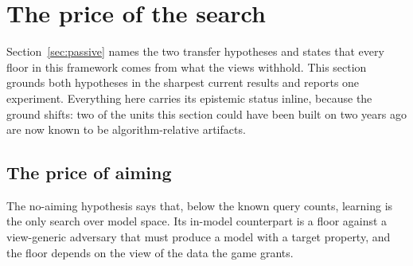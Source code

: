 \section{The price of the search}
\label{sec:price-search}

Section~\ref{sec:passive} names the two transfer hypotheses and states that
every floor in this framework comes from what the views withhold. This section
grounds both hypotheses in the sharpest current results and reports one
experiment. Everything here carries
its epistemic status inline, because the ground shifts: two of the units this
section could have been built on two years ago are now known to be
algorithm-relative artifacts.

\subsection{The price of aiming}
\label{sec:price-aiming}

The no-aiming hypothesis says that, below the known query counts, learning is
the only search over model space. Its in-model counterpart is a floor against a
view-generic adversary that must produce a model with a target property, and
the floor depends on the view of the data the game grants.

